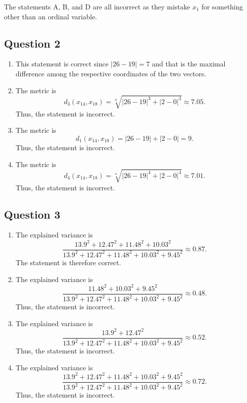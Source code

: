 \documentclass[twoside,11pt]{article}
\begin{document}
The statements A, B, and D are all incorrect as they mistake \(x_1\) for something other than an ordinal variable.

\subsection*{Question 2}

\begin{enumerate}[label=\Alph*.]
	\item This statement is correct since \(|26 - 19| = 7\) and that is the maximal difference among the respective coordinates of the two vectors.

	\item The metric is
	\[
		d_3(x_{14}, x_{18}) = \sqrt[3]{|26 - 19|^3 + |2 - 0|^3} \approx 7.05.
	\]
	Thus, the statement is incorrect.

	\item The metric is
	\[
		d_1(x_{14}, x_{18}) = |26 - 19| + |2 - 0| = 9.
	\]
	Thus, the statement is incorrect.

	\item The metric is
	\[
		d_4(x_{14}, x_{18}) = \sqrt[4]{|26 - 19|^4 + |2 - 0|^4} \approx 7.01.
	\]
	Thus, the statement is incorrect.

\end{enumerate}

\subsection*{Question 3}

\begin{enumerate}[label=\Alph*.]
	\item The explained variance is
	\[
		\frac{13.9^2 + 12.47^2 + 11.48^2 + 10.03^2}{13.9^2 + 12.47^2 + 11.48^2 + 10.03^2 + 9.45^2} \approx 0.87.
	\]
	The statement is therefore correct.

	\item The explained variance is
	\[
		\frac{11.48^2 + 10.03^2 + 9.45^2}{13.9^2 + 12.47^2 + 11.48^2 + 10.03^2 + 9.45^2} \approx 0.48.
	\]
	Thus, the statement is incorrect.

	\item The explained variance is
	\[
		\frac{13.9^2 + 12.47^2}{13.9^2 + 12.47^2 + 11.48^2 + 10.03^2 + 9.45^2} \approx 0.52.
	\]
	Thus, the statement is incorrect.

	\item The explained variance is
	\[
		\frac{13.9^2 + 12.47^2 + 11.48^2 + 10.03^2 + 9.45^2}{13.9^2 + 12.47^2 + 11.48^2 + 10.03^2 + 9.45^2} \approx 0.72.
	\]
	Thus, the statement is incorrect.

\end{enumerate}
\end{document}
